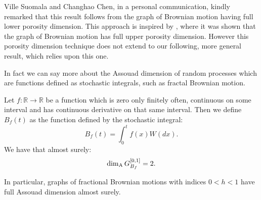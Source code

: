 Ville Suomala and Changhao Chen, in a personal communication, kindly remarked that this result follows from the graph of Brownian motion having full lower porosity dimension. This approach is inspired by \cite{coxgriffin}, where it was shown that the graph of Brownian motion has full upper porosity dimension. However this porosity dimension technique does not extend to our following, more general result, which relies upon this one.

In fact we can say more about the Assouad dimension of random processes which are functions defined as stochastic integrals, such as fractal Brownian motion. 

\begin{thm}
	Let $f:\mathbb{R}\to\mathbb{R}$ be a function which is zero only finitely often, continuous on some interval and has continuous derivative on that same interval. Then we define $B_f(t)$ as the function defined by the stochastic integral:
	\[	
	B_f(t)=\int_0^t f(x) W(dx).
	\]
	We have that almost surely:
	\[
	\dim_{\mathrm{A}} G_{B_f}^{[0,1]}=2.
	\]
\end{thm}
\begin{rem}
	In particular, graphs of fractional Brownian motions with indices $0<h<1$ have full Assouad dimension almost surely.
\end{rem}
